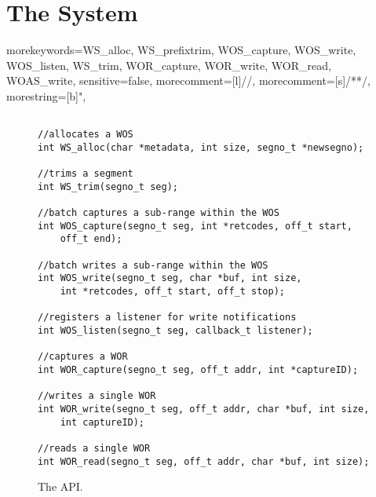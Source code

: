 \section{The \sysname{} System}



{morekeywords={WS_alloc, WS_prefixtrim, WOS_capture, WOS_write, WOS_listen, WS_trim, WOR_capture, WOR_write, WOR_read, WOAS_write},
sensitive=false,
morecomment=[l]{//},
morecomment=[s]{/*}{*/},
morestring=[b]",
}


\begin{figure}[t]
%
\centering
\footnotesize
\begin{lstlisting}[language=rock]%, basicstyle=\linespread{0.5}]

//allocates a WOS
int WS_alloc(char *metadata, int size, segno_t *newsegno);

//trims a segment
int WS_trim(segno_t seg); 

//batch captures a sub-range within the WOS
int WOS_capture(segno_t seg, int *retcodes, off_t start,
    off_t end);

//batch writes a sub-range within the WOS
int WOS_write(segno_t seg, char *buf, int size,
    int *retcodes, off_t start, off_t stop);

//registers a listener for write notifications
int WOS_listen(segno_t seg, callback_t listener);

//captures a WOR
int WOR_capture(segno_t seg, off_t addr, int *captureID);

//writes a single WOR
int WOR_write(segno_t seg, off_t addr, char *buf, int size,
    int captureID);

//reads a single WOR
int WOR_read(segno_t seg, off_t addr, char *buf, int size);
\end{lstlisting}
\caption{The \sysname{} API. \label{fig:api}}
\vspace{-0.1in}
\end{figure}

